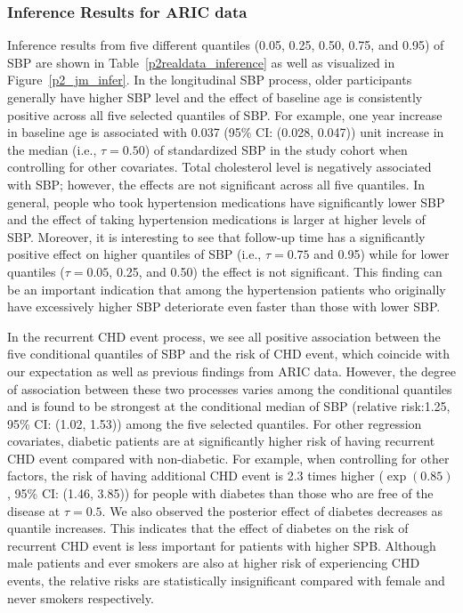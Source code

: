 \subsubsection{Inference Results for ARIC data}\label{sec:p2data_results}
Inference results from five different quantiles (0.05, 0.25, 0.50, 0.75, and 0.95) of SBP are shown in Table~\ref{p2realdata_inference} as well as visualized in Figure~\ref{p2_jm_infer}. In the longitudinal SBP process, older participants generally have higher SBP level and the effect of baseline age is consistently positive across all five selected quantiles of SBP. For example, one year increase in baseline age is associated with 0.037 (95\% CI: (0.028, 0.047)) unit increase in the median (i.e., $\tau=0.50$) of standardized SBP in the study cohort when controlling for other covariates. Total cholesterol level is negatively associated with SBP; however, the effects are not significant across all five quantiles. In general, people who took hypertension medications have significantly lower SBP and the effect of taking hypertension medications is larger at higher levels of SBP. Moreover, it is interesting to see that follow-up time has a significantly positive effect on higher quantiles of SBP (i.e., $\tau=0.75$ and 0.95) while for lower quantiles ($\tau=0.05$, 0.25, and 0.50) the effect is not significant. This finding can be an important indication that among the hypertension patients who originally have excessively higher SBP deteriorate even faster than those with lower SBP.

In the recurrent CHD event process, we see all positive association between the five conditional quantiles of SBP and the risk of CHD event, which coincide with our expectation as well as previous findings from ARIC data. However, the degree of association between these two processes varies among the conditional quantiles and is found to be strongest at the conditional median of SBP (relative risk:1.25, 95\% CI: (1.02, 1.53)) among the five selected quantiles. For other regression covariates, diabetic patients are at significantly higher risk of having recurrent CHD event compared with non-diabetic. For example, when controlling for other factors, the risk of having additional CHD event is 2.3 times higher ($\exp(0.85)$, 95\% CI: (1.46, 3.85)) for people with diabetes than those who are free of the disease at $\tau=0.5$. We also observed the posterior effect of diabetes decreases as quantile increases. This indicates that the effect of diabetes on the risk of recurrent CHD event is less important for patients with higher SPB. Although  male patients and ever smokers are also at higher risk of experiencing CHD events, the relative risks are statistically insignificant compared with female and never smokers respectively.

